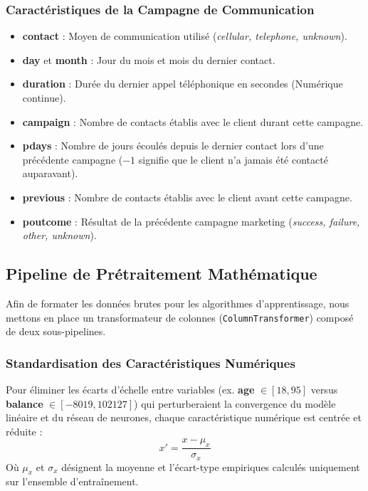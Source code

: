 \documentclass[12pt,a4paper]{article}
\begin{document}
\subsubsection{Caractéristiques de la Campagne de Communication}
\begin{itemize}
    \item \textbf{contact} : Moyen de communication utilisé (\emph{cellular, telephone, unknown}).
    \item \textbf{day} et \textbf{month} : Jour du mois et mois du dernier contact.
    \item \textbf{duration} : Durée du dernier appel téléphonique en secondes (Numérique continue).
    \item \textbf{campaign} : Nombre de contacts établis avec le client durant cette campagne.
    \item \textbf{pdays} : Nombre de jours écoulés depuis le dernier contact lors d'une précédente campagne ($-1$ signifie que le client n'a jamais été contacté auparavant).
    \item \textbf{previous} : Nombre de contacts établis avec le client avant cette campagne.
    \item \textbf{poutcome} : Résultat de la précédente campagne marketing (\emph{success, failure, other, unknown}).
\end{itemize}

\subsection{Pipeline de Prétraitement Mathématique}
Afin de formater les données brutes pour les algorithmes d'apprentissage, nous mettons en place un transformateur de colonnes (\texttt{ColumnTransformer}) composé de deux sous-pipelines.

\subsubsection{Standardisation des Caractéristiques Numériques}
Pour éliminer les écarts d'échelle entre variables (ex. \textbf{age} $\in [18, 95]$ versus \textbf{balance} $\in [-8019, 102127]$) qui perturberaient la convergence du modèle linéaire et du réseau de neurones, chaque caractéristique numérique est centrée et réduite :
\begin{equation}
    x' = \frac{x - \mu_{x}}{\sigma_{x}}
\end{equation}
Où $\mu_{x}$ et $\sigma_{x}$ désignent la moyenne et l'écart-type empiriques calculés uniquement sur l'ensemble d'entraînement.
\end{document}
